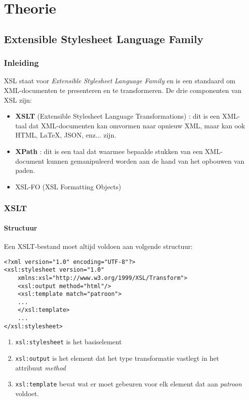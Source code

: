 \documentclass{report}
\begin{document}
    \tableofcontents

	
	\part{Theorie}
	\chapter{Extensible Stylesheet Language Family}
	\section{Inleiding}
	XSL staat voor \textit{Extensible Stylesheet Language Family} en is een standaard om XML-documenten te presenteren en te transformeren. De drie componenten van XSL zijn:
	\begin{itemize}
		\item \textbf{XSLT} (Extensible Stylesheet Language Transformations) : dit is een XML-taal dat XML-documenten kan omvormen naar opnieuw XML, maar kan ook HTML, \LaTeX, JSON, enz... zijn.
		\item \textbf{XPath} : dit is een taal dat waarmee bepaalde stukken van een XML-document kunnen gemanipuleerd worden aan de hand van het opbouwen van paden.
		\item XSL-FO (XSL Formatting Objects)
	\end{itemize}
	\section{XSLT}
	\subsection{Structuur}
	Een XSLT-bestand moet altijd voldoen aan volgende structuur:
	\begin{lstlisting}
<?xml version="1.0" encoding="UTF-8"?>
<xsl:stylesheet version="1.0" 
	xmlns:xsl="http://www.w3.org/1999/XSL/Transform">
	<xsl:output method="html"/>
	<xsl:template match="patroon">
	...
	</xsl:template>
	...
</xsl:stylesheet>
	\end{lstlisting}
	\begin{enumerate}
		\item \texttt{xsl:stylesheet} is het basiselement
		\item \texttt{xsl:output} is het element dat het type transformatie vastlegt in het attribuut \textit{method}
		\item \texttt{xsl:template} bevat wat er moet gebeuren voor elk element dat aan \textit{patroon} voldoet.
	\end{enumerate}
\end{document}
